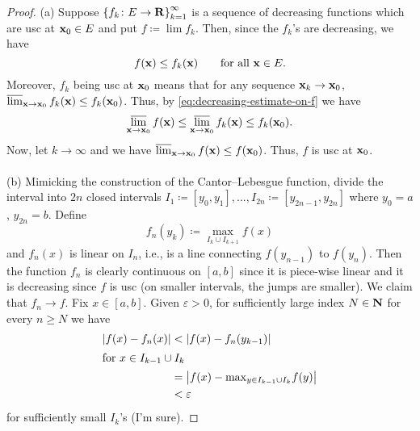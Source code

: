 \begin{proof}
(a) Suppose $\left\{f_k\colon E\to\mathbf{R}\right\}_{k=1}^\infty$ is a sequence
of decreasing functions which are usc at $\mathbf{x}_0\in E$ and put $f\coloneqq\lim
f_k$. Then, since the $f_k$'s are decreasing, we have
\begin{equation}
  \label{eq:decreasing-estimate-on-f}
f(\mathbf{x})\leq f_k(\mathbf{x})\qquad\text{for all $\mathbf{x}\in E$.}
\end{equation}
Moreover, $f_k$ being usc at $\mathbf{x}_0$ means that for any sequence
$\mathbf{x}_k\to\mathbf{x}_0$, $\varlimsup_{\mathbf{x}\to\mathbf{x}_0} f_k(\mathbf{x})\leq
f_k(\mathbf{x}_0)$. Thus, by \eqref{eq:decreasing-estimate-on-f} we have
\begin{equation}
  \label{eq:limit-estimate-on-f}
\varlimsup_{\mathbf{x}\to\mathbf{x}_0}f(\mathbf{x})\leq\varlimsup_{\mathbf{x}\to\mathbf{x}_0}
f_k(\mathbf{x})\leq f_k(\mathbf{x}_0).
\end{equation}
Now, let $k\to\infty$ and we have $\varlimsup_{\mathbf{x}\to\mathbf{x}_0} f(\mathbf{x})\leq
f(\mathbf{x}_0)$. Thus, $f$ is usc at $\mathbf{x}_0$.
\\\\
(b) Mimicking the construction of the Cantor--Lebesgue function, divide the
interval into $2n$ closed intervals
$I_1\coloneqq[y_0,y_1],...,I_{2n}\coloneqq[y_{2n-1},y_{2n}]$ where $y_0=a$,
$y_{2n}=b$. Define
\begin{equation}
  \label{eq:define-fn}
f_n(y_k)\coloneqq\max_{I_{k}\cup I_{k+1}} f(x)
\end{equation}
and $f_n(x)$ is linear on $I_n$, i.e., is a line connecting $f(y_{n-1})$ to
$f(y_n)$. Then the function $f_n$ is clearly continuous on $[a,b]$ since it
is piece-wise linear and it is decreasing since $f$ is usc (on smaller
intervals, the jumps are smaller). We claim that $f_n\to f$.  Fix
$x\in[a,b]$. Given $\varepsilon>0$, for sufficiently large index $N\in\mathbf{N}$
for every $n\geq N$ we have
\begin{align*}
|f(x)-f_n(x)|&<\left|f(x)-f_n(y_{k-1})\right|\\
\shortintertext{for $x\in I_{k-1}\cup I_k$}
             &=\bigl|f(x)-{\textstyle\max_{y\in I_{k-1}\cup I_{k}}}f(y)\bigr|\\
             &<\varepsilon
\end{align*}
for sufficiently small $I_k$'s (I'm sure).
\end{proof}
\newpage

